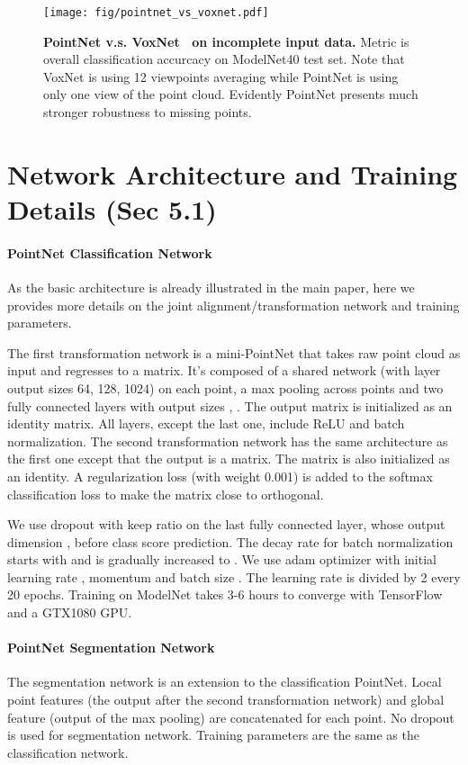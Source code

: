 \documentclass[10pt,twocolumn,letterpaper]{article}
\begin{document}
\begin{figure}[h!]
    \centering
    \texttt{[image: fig/pointnet\_vs\_voxnet.pdf]}
    \caption{\textbf{PointNet v.s. VoxNet~\cite{maturana2015voxnet} on incomplete input data.} Metric is overall classification accurcacy on ModelNet40 test set. Note that VoxNet is using 12 viewpoints averaging while PointNet is using only one view of the point cloud. Evidently PointNet presents much stronger robustness to missing points.}
    \label{fig:compare}
\end{figure}

\section{Network Architecture and Training Details (Sec 5.1)}
\label{sec:network}
\paragraph{PointNet Classification Network} As the basic architecture is already illustrated in the main paper, here we provides more details on the joint alignment/transformation network and training parameters.

The first transformation network is a mini-PointNet that takes raw point cloud as input and regresses to a  matrix. It's composed of a shared  network (with layer output sizes 64, 128, 1024) on each point, a max pooling across points and two fully connected layers with output sizes , . The output matrix is initialized as an identity matrix. All layers, except the last one, include ReLU and batch normalization. The second transformation network has the same architecture as the first one except that the output is a   matrix. The matrix is also initialized as an identity. A regularization loss (with weight 0.001) is added to the softmax classification loss to make the matrix close to orthogonal.

We use dropout with keep ratio  on the last fully connected layer, whose output dimension , before class score prediction. The decay rate for batch normalization starts with  and is gradually increased to . We use adam optimizer with initial learning rate , momentum  and batch size . The learning rate is divided by 2 every 20 epochs. Training on ModelNet takes 3-6 hours to converge with TensorFlow and a GTX1080 GPU.

\paragraph{PointNet Segmentation Network} The segmentation network is an extension to the classification PointNet. Local point features (the output after the second transformation network) and global feature (output of the max pooling) are concatenated for each point. No dropout is used for segmentation network. Training parameters are the same as the classification network.
\end{document}
